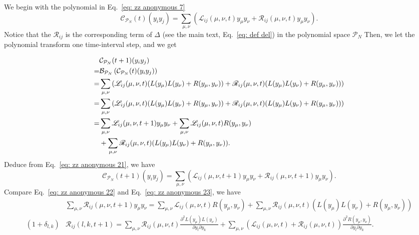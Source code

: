 \documentclass[showpacs,twocolumn,aps,prx,long bibliography,superscriptaddress,notitlepage]{revtex4-1}
\begin{document}
We begin with the polynomial in Eq.~\eqref{eq: zz anonymous 7}
\begin{equation}
\label{eq: zz anonymous 21}
    \mathcal{C}_{\mathcal{P}_N} (t) (y_i y_j) 
    =\sum_{\mu,\nu} \left(\mathscr{L}_{ij} (\mu, \nu, t) y_\mu y_\nu + \mathscr{R}_{ij} (\mu, \nu, t) y_\mu y_\nu\right).
\end{equation}
Notice that the $\mathscr{R}_{ij}$ is the corresponding term of $\Delta$ (see the main text, Eq.~\eqref{eq: def del}) in the polynomial space $\mathcal{P}_N$
Then, we let the polynomial transform one time-interval step, and we get
\begin{widetext}
    
\begin{align}
    &\mathcal{C}_{\mathcal{P}_N} (t+1) (y_i y_j) \\
    =& \mathcal{B}_{\mathcal{P}_N}\left(\mathcal{C}_{\mathcal{P}_N} (t) (y_i y_j)\right) \\
    =& \sum_{\mu,\nu} \left(\mathscr{L}_{ij} (\mu, \nu, t) (L(y_\mu) L(y_\nu) + R(y_\mu, y_\nu)) + \mathscr{R}_{ij} (\mu, \nu, t) (L(y_\mu) L(y_\nu) + R(y_\mu, y_\nu))\right)\\
    =& \sum_{\mu,\nu} \left(\mathscr{L}_{ij} (\mu, \nu, t) (L(y_\mu) L(y_\nu) + R(y_\mu, y_\nu)) + \mathscr{R}_{ij} (\mu, \nu, t) (L(y_\mu) L(y_\nu) + R(y_\mu, y_\nu))\right)\\
    =& \sum_{\mu,\nu} \mathscr{L}_{ij} (\mu, \nu, t+1) y_\mu y_\nu +  \sum_{\mu,\nu}\mathscr{L}_{ij} (\mu, \nu, t) R(y_\mu, y_\nu) \nonumber\\
    & + \sum_{\mu,\nu}\mathscr{R}_{ij} (\mu, \nu, t) (L(y_\mu) L(y_\nu) + R(y_\mu, y_\nu)).
    \label{eq: zz anonymous 22}
\end{align}
Deduce from Eq.~\eqref{eq: zz anonymous 21}, we have
\begin{equation}
    \label{eq: zz anonymous 23}
    \mathcal{C}_{\mathcal{P}_N} (t+1) (y_i y_j) 
    =\sum_{\mu,\nu} \left(\mathscr{L}_{ij} (\mu, \nu, t+1) y_\mu y_\nu + \mathscr{R}_{ij} (\mu, \nu, t+1) y_\mu y_\nu\right). 
\end{equation}
Compare Eq.~\eqref{eq: zz anonymous 22} and Eq.~\eqref{eq: zz anonymous 23}, we have 
\begin{align}
    &\sum_{\mu,\nu} \mathscr{R}_{ij} (\mu, \nu, t+1) y_\mu y_\nu = \sum_{\mu,\nu}\mathscr{L}_{ij} (\mu, \nu, t) R(y_\mu, y_\nu) + \sum_{\mu,\nu}\mathscr{R}_{ij} (\mu, \nu, t) (L(y_\mu) L(y_\nu) + R(y_\mu, y_\nu)) \\
    (1+ \delta_{l,k})  &\mathscr{R}_{ij} (l, k, t+1) =  \sum_{\mu,\nu}\mathscr{R}_{ij} (\mu, \nu, t) \frac{\partial^2L(y_\mu) L(y_\nu)}{\partial y_l \partial y_k} + \sum_{\mu,\nu}\left( \mathscr{L}_{ij} (\mu, \nu, t) + \mathscr{R}_{ij} (\mu, \nu, t) \right)\frac{\partial^2 R(y_\mu, y_\nu)}{\partial y_l \partial y_k}.
    \label{eq: strict recursive relation}
\end{align}
\end{widetext}
\end{document}

